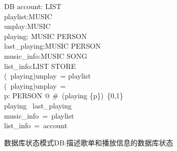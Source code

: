\documentclass[14pt]{article}
\numberwithin{figure}{subsection}
\begin{document}
\vspace{-1.3cm}
\begin{figure}[H]
    \setlength{\abovecaptionskip}{0.cm}
    \setlength{\belowcaptionskip}{0.cm}
    \begin{schema}{DB}
        account: \power LIST\\
        playlist:\power MUSIC\\
        unplay:\power MUSIC\\
        playing: \power MUSIC \pfun PERSON\\
        last\_playing:\power MUSIC \pfun PERSON\\
        music\_info:MUSIC \pfun SONG\\
        list\_info:LIST \pfun STORE\\
        \where
        (\dom \ playing)\cup unplay\ = playlist\\
        (\dom \ playing)\cap unplay\ = \emptyset\\
        \forall p: PERSON @ \#~(playing \rres \{p\})\subseteq\ \{0,1\}\\
        playing \subseteq \ last\_playing\\
        \dom music\_info\ =\ playlist\\
        \dom list\_info\ =\ account\\
    \end{schema}
    \caption{数据库状态模式DB:描述歌单和播放信息的数据库状态}
\end{figure}
\end{document}
